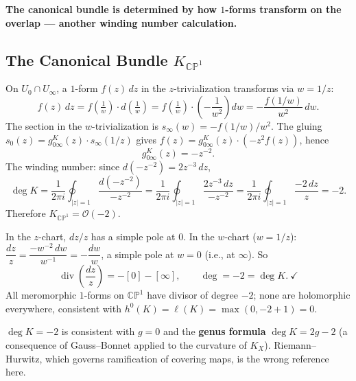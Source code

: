 \documentclass[11pt,openany]{article}
\renewcommand{\emph}[1]{\textbf{#1}}
\newcommand{\CP}{\mathbb{CP}}
\newcommand{\CPone}{\CP^1}
\renewcommand{\div}{\operatorname{div}}
\begin{document}
\medskip\noindent
\emph{The canonical bundle is determined by how $1$-forms transform on the overlap
— another winding number calculation.}

\subsection{The Canonical Bundle $K_{\CPone}$}
\label{subsec:canonical}


\begin{remark}
On $U_0\cap U_\infty$, a $1$-form $f(z)\,dz$ in the $z$-trivialization transforms
via $w=1/z$:
\[
  f(z)\,dz
  = f\!\left(\tfrac{1}{w}\right)\cdot d\!\left(\tfrac{1}{w}\right)
  = f\!\left(\tfrac{1}{w}\right)\cdot\left(-\frac{1}{w^2}\right)dw
  = -\frac{f(1/w)}{w^2}\,dw.
\]
The section in the $w$-trivialization is $s_\infty(w)=-f(1/w)/w^2$.
The gluing $s_0(z)=g^K_{0\infty}(z)\cdot s_\infty(1/z)$ gives
$f(z)=g^K_{0\infty}(z)\cdot(-z^2 f(z))$, hence
\[
  g^K_{0\infty}(z) = -z^{-2}.
\]
The winding number: since $d(-z^{-2})=2z^{-3}\,dz$,
\[
  \deg K
  = \frac{1}{2\pi i}\oint_{|z|=1}\frac{d(-z^{-2})}{-z^{-2}}
  = \frac{1}{2\pi i}\oint_{|z|=1}\frac{2z^{-3}\,dz}{-z^{-2}}
  = \frac{1}{2\pi i}\oint_{|z|=1}\frac{-2\,dz}{z}
  = -2.
\]
Therefore $K_{\CPone}=\mathcal{O}(-2)$.
\end{remark}

\begin{observation}
In the $z$-chart, $dz/z$ has a simple pole at $0$.
In the $w$-chart ($w=1/z$): $\dfrac{dz}{z}=\dfrac{-w^{-2}\,dw}{w^{-1}}=-\dfrac{dw}{w}$,
a simple pole at $w=0$ (i.e., at $\infty$).
So
\[
  \div\!\left(\frac{dz}{z}\right) = -[0]-[\infty],
  \qquad
  \deg = -2 = \deg K.\ \checkmark
\]
All meromorphic $1$-forms on $\CPone$ have divisor of degree $-2$;
none are holomorphic everywhere, consistent with
$h^0(K)=\ell(K)=\max(0,-2+1)=0$.
\end{observation}

\begin{remark}
$\deg K=-2$ is consistent with $g=0$ and the \textbf{genus formula}
$\deg K=2g-2$ (a consequence of Gauss--Bonnet applied to the curvature of $K_X$).
Riemann--Hurwitz, which governs ramification of covering maps, is the wrong reference here.
\end{remark}
\end{document}
